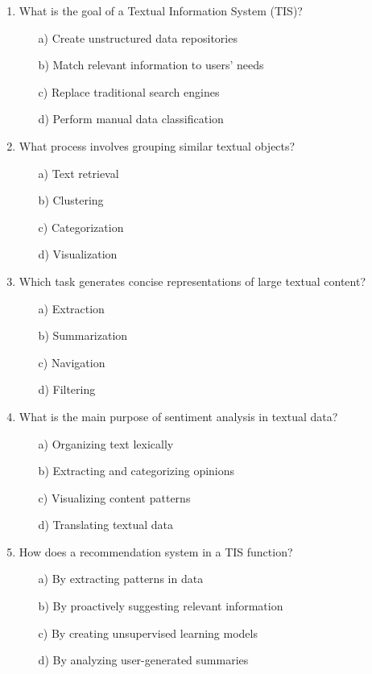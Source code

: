 \documentclass[8pt]{extarticle}
\begin{document}
\begin{multicols}{2}
\begin{enumerate}
\item What is the goal of a Textual Information System (TIS)?
\begin{itemize}
    \item[a)] Create unstructured data repositories
    \item[b)] Match relevant information to users' needs
    \item[c)] Replace traditional search engines
    \item[d)] Perform manual data classification
\end{itemize}

\item What process involves grouping similar textual objects?
\begin{itemize}
    \item[a)] Text retrieval
    \item[b)] Clustering
    \item[c)] Categorization
    \item[d)] Visualization
\end{itemize}

\item Which task generates concise representations of large textual content?
\begin{itemize}
    \item[a)] Extraction
    \item[b)] Summarization
    \item[c)] Navigation
    \item[d)] Filtering
\end{itemize}

\item What is the main purpose of sentiment analysis in textual data?
\begin{itemize}
    \item[a)] Organizing text lexically
    \item[b)] Extracting and categorizing opinions
    \item[c)] Visualizing content patterns
    \item[d)] Translating textual data
\end{itemize}

\item How does a recommendation system in a TIS function?
\begin{itemize}
    \item[a)] By extracting patterns in data
    \item[b)] By proactively suggesting relevant information
    \item[c)] By creating unsupervised learning models
    \item[d)] By analyzing user-generated summaries
\end{itemize}


\end{enumerate}
\end{multicols}
\end{document}
